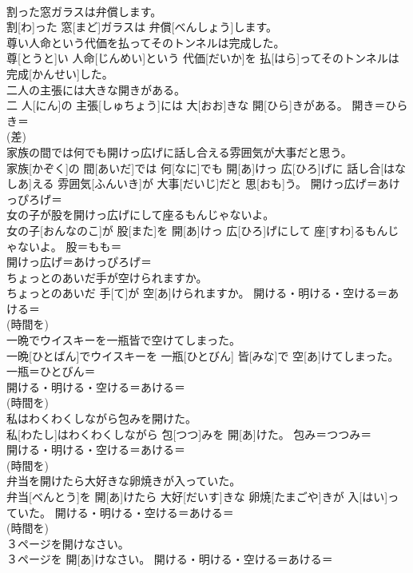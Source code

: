 \documentclass[8pt]{extreport}
\begin{document}
\begin{CJK}{UTF8}{min}
{\\	割った窓ガラスは弁償します。	
\\	割[わ]った 窓[まど]ガラスは 弁償[べんしょう]します。	
\\	尊い人命という代価を払ってそのトンネルは完成した。	
\\	尊[とうと]い 人命[じんめい]という 代価[だいか]を 払[はら]ってそのトンネルは 完成[かんせい]した。	
\\	二人の主張には大きな開きがある。	
\\	二 人[にん]の 主張[しゅちょう]には 大[おお]きな 開[ひら]きがある。	開き＝ひらき＝ 
\\	(差) 
\\	家族の間では何でも開けっ広げに話し合える雰囲気が大事だと思う。	
\\	家族[かぞく]の 間[あいだ]では 何[なに]でも 開[あ]けっ 広[ひろ]げに 話し合[はなしあ]える 雰囲気[ふんいき]が 大事[だいじ]だと 思[おも]う。	開けっ広げ＝あけっぴろげ＝ 
\\	女の子が股を開けっ広げにして座るもんじゃないよ。	
\\	女の子[おんなのこ]が 股[また]を 開[あ]けっ 広[ひろ]げにして 座[すわ]るもんじゃないよ。	股＝もも＝ 
\\	開けっ広げ＝あけっぴろげ＝ 
\\	ちょっとのあいだ手が空けられますか。	
\\	ちょっとのあいだ 手[て]が 空[あ]けられますか。	開ける・明ける・空ける＝あける＝ 
\\	(時間を) 
\\	一晩でウイスキーを一瓶皆で空けてしまった。	
\\	一晩[ひとばん]でウイスキーを 一瓶[ひとびん] 皆[みな]で 空[あ]けてしまった。	一瓶＝ひとびん＝ 
\\	開ける・明ける・空ける＝あける＝ 
\\	(時間を) 
\\	私はわくわくしながら包みを開けた。	
\\	私[わたし]はわくわくしながら 包[つつ]みを 開[あ]けた。	包み＝つつみ＝ 
\\	開ける・明ける・空ける＝あける＝ 
\\	(時間を) 
\\	弁当を開けたら大好きな卵焼きが入っていた。	
\\	弁当[べんとう]を 開[あ]けたら 大好[だいす]きな 卵焼[たまごや]きが 入[はい]っていた。	開ける・明ける・空ける＝あける＝ 
\\	(時間を) 
\\	３ページを開けなさい。	
\\	３ページを 開[あ]けなさい。	開ける・明ける・空ける＝あける＝ 
}
\end{CJK}
\end{document}
